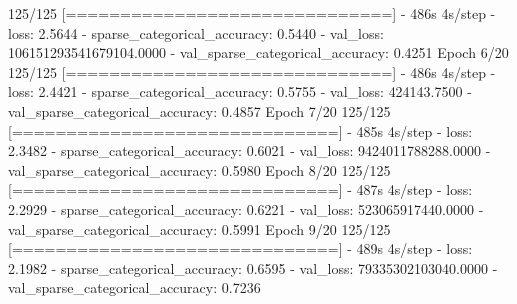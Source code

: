 \documentclass[
  12pt,
  a4paper,
]{article}
\newenvironment{Shaded}{}{}
\newcommand{\BuiltInTok}[1]{#1}
\newcommand{\DecValTok}[1]{\textcolor[rgb]{0.25,0.63,0.44}{#1}}
\newcommand{\FloatTok}[1]{\textcolor[rgb]{0.25,0.63,0.44}{#1}}
\newcommand{\NormalTok}[1]{#1}
\newcommand{\OperatorTok}[1]{\textcolor[rgb]{0.40,0.40,0.40}{#1}}
\begin{document}
\begin{Shaded}
\begin{Highlighting}[]
\DecValTok{125}\OperatorTok{/}\DecValTok{125} \OperatorTok{[==============================]} \OperatorTok{{-}} \DecValTok{486}\BuiltInTok{s} \DecValTok{4}\BuiltInTok{s}\OperatorTok{/}\NormalTok{step }\OperatorTok{{-}}\NormalTok{ loss}\OperatorTok{:} \FloatTok{2.5644} \OperatorTok{{-}}\NormalTok{ sparse\_categorical\_accuracy}\OperatorTok{:} \FloatTok{0.5440} \OperatorTok{{-}}\NormalTok{ val\_loss}\OperatorTok{:} \FloatTok{106151293541679104.0000} \OperatorTok{{-}}\NormalTok{ val\_sparse\_categorical\_accuracy}\OperatorTok{:} \FloatTok{0.4251}
\NormalTok{Epoch }\DecValTok{6}\OperatorTok{/}\DecValTok{20}
\DecValTok{125}\OperatorTok{/}\DecValTok{125} \OperatorTok{[==============================]} \OperatorTok{{-}} \DecValTok{486}\BuiltInTok{s} \DecValTok{4}\BuiltInTok{s}\OperatorTok{/}\NormalTok{step }\OperatorTok{{-}}\NormalTok{ loss}\OperatorTok{:} \FloatTok{2.4421} \OperatorTok{{-}}\NormalTok{ sparse\_categorical\_accuracy}\OperatorTok{:} \FloatTok{0.5755} \OperatorTok{{-}}\NormalTok{ val\_loss}\OperatorTok{:} \FloatTok{424143.7500} \OperatorTok{{-}}\NormalTok{ val\_sparse\_categorical\_accuracy}\OperatorTok{:} \FloatTok{0.4857}
\NormalTok{Epoch }\DecValTok{7}\OperatorTok{/}\DecValTok{20}
\DecValTok{125}\OperatorTok{/}\DecValTok{125} \OperatorTok{[==============================]} \OperatorTok{{-}} \DecValTok{485}\BuiltInTok{s} \DecValTok{4}\BuiltInTok{s}\OperatorTok{/}\NormalTok{step }\OperatorTok{{-}}\NormalTok{ loss}\OperatorTok{:} \FloatTok{2.3482} \OperatorTok{{-}}\NormalTok{ sparse\_categorical\_accuracy}\OperatorTok{:} \FloatTok{0.6021} \OperatorTok{{-}}\NormalTok{ val\_loss}\OperatorTok{:} \FloatTok{9424011788288.0000} \OperatorTok{{-}}\NormalTok{ val\_sparse\_categorical\_accuracy}\OperatorTok{:} \FloatTok{0.5980}
\NormalTok{Epoch }\DecValTok{8}\OperatorTok{/}\DecValTok{20}
\DecValTok{125}\OperatorTok{/}\DecValTok{125} \OperatorTok{[==============================]} \OperatorTok{{-}} \DecValTok{487}\BuiltInTok{s} \DecValTok{4}\BuiltInTok{s}\OperatorTok{/}\NormalTok{step }\OperatorTok{{-}}\NormalTok{ loss}\OperatorTok{:} \FloatTok{2.2929} \OperatorTok{{-}}\NormalTok{ sparse\_categorical\_accuracy}\OperatorTok{:} \FloatTok{0.6221} \OperatorTok{{-}}\NormalTok{ val\_loss}\OperatorTok{:} \FloatTok{523065917440.0000} \OperatorTok{{-}}\NormalTok{ val\_sparse\_categorical\_accuracy}\OperatorTok{:} \FloatTok{0.5991}
\NormalTok{Epoch }\DecValTok{9}\OperatorTok{/}\DecValTok{20}
\DecValTok{125}\OperatorTok{/}\DecValTok{125} \OperatorTok{[==============================]} \OperatorTok{{-}} \DecValTok{489}\BuiltInTok{s} \DecValTok{4}\BuiltInTok{s}\OperatorTok{/}\NormalTok{step }\OperatorTok{{-}}\NormalTok{ loss}\OperatorTok{:} \FloatTok{2.1982} \OperatorTok{{-}}\NormalTok{ sparse\_categorical\_accuracy}\OperatorTok{:} \FloatTok{0.6595} \OperatorTok{{-}}\NormalTok{ val\_loss}\OperatorTok{:} \FloatTok{79335302103040.0000} \OperatorTok{{-}}\NormalTok{ val\_sparse\_categorical\_accuracy}\OperatorTok{:} \FloatTok{0.7236}

\end{Highlighting}
\end{Shaded}
\end{document}
